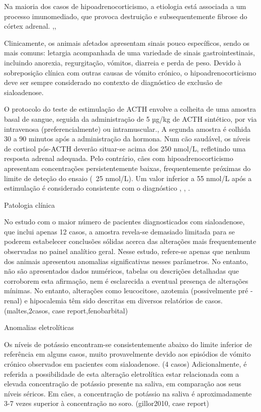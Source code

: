 Na maioria dos casos de hipoadrenocorticismo, a etiologia está associada a um processo imunomediado, que provoca destruição e subsequentemente fibrose do córtex adrenal. \cite{Wakayama2017},\cite{Spence2018},\cite{Mooney2023} 


Clinicamente, os animais afetados apresentam sinais pouco específicos, sendo os mais comuns: letargia acompanhada de uma variedade de sinais gastrointestinais, incluindo anorexia, regurgitação, vómitos, diarreia e perda de peso. \cite{Guzman-Ramos2022} Devido à sobreposição clínica com outras causas de vómito crónico, o hipoadrenocorticismo deve ser sempre considerado no contexto de diagnóstico de exclusão de sialoadenose.


O protocolo do teste de estimulação de ACTH envolve a colheita de uma amostra basal de sangue, seguida da administração de 5 µg/kg de ACTH sintético, por via intravenosa (preferencialmente) ou intramuscular.\cite{Spence2018}, \cite{Mooney2023} A segunda amostra é colhida 30 a 90 minutos após a administração da hormona. \cite{Spence2018}
Num cão saudável, os níveis de cortisol pós-ACTH deverão situar-se acima dos 250 nmol/L, refletindo uma resposta adrenal adequada. \cite{Mooney2023} Pelo contrário, cães com hipoadrenocorticismo apresentam concentrações persistentemente baixas, frequentemente próximas do limite de deteção do ensaio (~25 nmol/L). \cite{Mooney2023} Um valor inferior a 55 nmol/L após a estimulação é considerado consistente com o diagnóstico \cite{Wakayama2017}, \cite{Mooney2023}, \cite{Guzman-Ramos2022}.

Patologia clínica


No estudo com o maior número de pacientes diagnosticados com sialoadenose, que inclui apenas 12 casos, a amostra revela-se demasiado limitada para se poderem estabelecer conclusões sólidas acerca das alterações mais frequentemente observadas no painel analítico geral. Nesse estudo, refere-se apenas que nenhum dos animais apresentou anomalias significativas nesses parâmetros. \cite{boydell_sialadenosis_2000} No entanto, não são apresentados dados numéricos, tabelas ou descrições detalhadas que corroborem esta afirmação, nem é esclarecida a eventual presença de alterações mínimas.
No entanto, alterações como leucocitose, azotemia (possivelmente pré -renal) e hipocalemia têm sido descritas em diversos relatórios de casos. (maltes,2casos, case report,fenobarbital)


Anomalias eletrolíticas


Os níveis de potássio encontram-se consistentemente abaixo do limite inferior de referência em alguns casos, muito provavelmente devido aos episódios de vómito crónico observados em pacientes com sialoadenose. (4 casos) Adicionalmente, é referida a possibilidade de esta alteração eletrolítica estar relacionada com a elevada concentração de potássio presente na saliva, em comparação aos seus níveis séricos. Em cães, a concentração de potássio na saliva é aproximadamente 3-7 vezes superior à concentração no soro. (gillor2010, case report)


